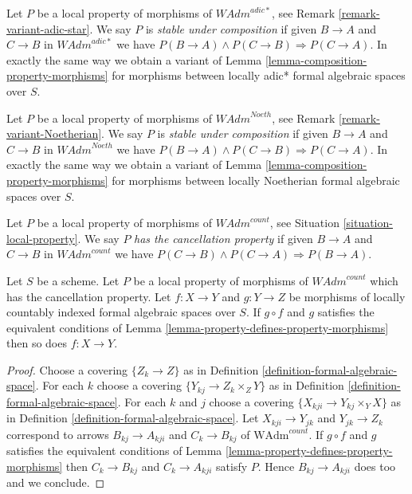 \begin{remark}
\label{remark-composition-variant-adic-star}
Let $P$ be a local property of morphisms of $\textit{WAdm}^{adic*}$, see
Remark \ref{remark-variant-adic-star}. We say $P$ is {\it stable under
composition} if given $B \to A$ and $C \to B$ in $\textit{WAdm}^{adic*}$
we have $P(B \to A) \wedge P(C \to B) \Rightarrow P(C \to A)$.
In exactly the same way we obtain a variant of
Lemma \ref{lemma-composition-property-morphisms}
for morphisms between locally adic* formal algebraic spaces over $S$.
\end{remark}

\begin{remark}
\label{remark-composition-variant-Noetherian}
Let $P$ be a local property of morphisms of $\textit{WAdm}^{Noeth}$, see
Remark \ref{remark-variant-Noetherian}. We say $P$ is
{\it stable under composition} if given $B \to A$ and $C \to B$
in $\textit{WAdm}^{Noeth}$ we have
$P(B \to A) \wedge P(C \to B) \Rightarrow P(C \to A)$.
In exactly the same way we obtain a variant of
Lemma \ref{lemma-composition-property-morphisms}
for morphisms between locally Noetherian formal algebraic spaces over $S$.
\end{remark}

\begin{situation}
\label{situation-permanence-local-property}
Let $P$ be a local property of morphisms of $\textit{WAdm}^{count}$, see
Situation \ref{situation-local-property}. We say $P$
{\it has the cancellation property}
if given $B \to A$ and $C \to B$ in $\textit{WAdm}^{count}$
we have $P(C \to B) \wedge P(C \to A) \Rightarrow P(B \to A)$.
\end{situation}

\begin{lemma}
\label{lemma-permanence-property-morphisms}
Let $S$ be a scheme. Let $P$ be a local property of morphisms of
$\textit{WAdm}^{count}$ which has the cancellation property.
Let $f : X \to Y$ and $g : Y \to Z$ be morphisms of locally countably indexed
formal algebraic spaces over $S$. If $g \circ f$ and $g$
satisfies the equivalent conditions of
Lemma \ref{lemma-property-defines-property-morphisms}
then so does $f : X \to Y$.
\end{lemma}

\begin{proof}
Choose a covering $\{Z_k \to Z\}$ as in
Definition \ref{definition-formal-algebraic-space}.
For each $k$ choose a covering $\{Y_{kj} \to Z_k \times_Z Y\}$
as in Definition \ref{definition-formal-algebraic-space}.
For each $k$ and $j$ choose a covering $\{X_{kji} \to Y_{kj} \times_Y X\}$
as in Definition \ref{definition-formal-algebraic-space}.
Let $X_{kji} \to Y_{jk}$ and $Y_{jk} \to Z_k$
correspond to arrows
$B_{kj} \to A_{kji}$ and $C_k \to B_{kj}$ of
$\text{WAdm}^{count}$.
If $g \circ f$ and $g$ satisfies the equivalent conditions of
Lemma \ref{lemma-property-defines-property-morphisms}
then $C_k \to B_{kj}$ and $C_k \to A_{kji}$ satisfy $P$.
Hence $B_{kj} \to A_{kji}$ does too and we conclude.
\end{proof}

